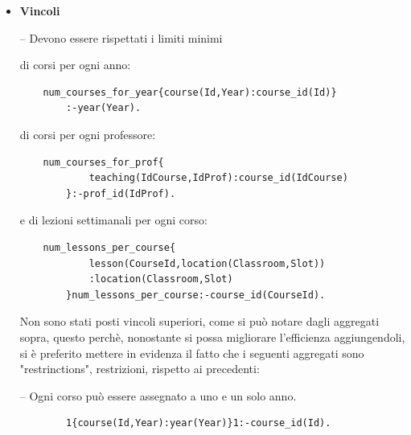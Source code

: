 \documentclass[a4paper,oneside,12pt]{book}
\def \code#1{\texttt{#1}}
\begin{document}
\begin{itemize}[align=left]
        \item \textbf{Vincoli}
        \item [--] Devono essere rispettati i limiti minimi

        di corsi per ogni anno:
        \begin{verbatim}    num_courses_for_year{course(Id,Year):course_id(Id)}
        :-year(Year).
        \end{verbatim}
        di corsi per ogni professore:
        \begin{verbatim}    num_courses_for_prof{
            teaching(IdCourse,IdProf):course_id(IdCourse)
        }:-prof_id(IdProf).
        \end{verbatim}
        e di lezioni settimanali per ogni corso:
        \begin{verbatim}    num_lessons_per_course{
            lesson(CourseId,location(Classroom,Slot))
            :location(Classroom,Slot)
        }num_lessons_per_course:-course_id(CourseId).
        \end{verbatim}
        Non sono stati posti vincoli superiori, come si può notare dagli aggregati sopra, questo perchè, nonostante
        si possa migliorare l'efficienza aggiungendoli, si è preferito mettere in evidenza il fatto che i seguenti
        aggregati sono "restrinctions", restrizioni, rispetto ai precedenti:

        \item [--] Ogni corso può essere assegnato a uno e un solo anno.
        \begin{verbatim}        1{course(Id,Year):year(Year)}1:-course_id(Id).
        \end{verbatim}


\end{itemize}
\end{document}
